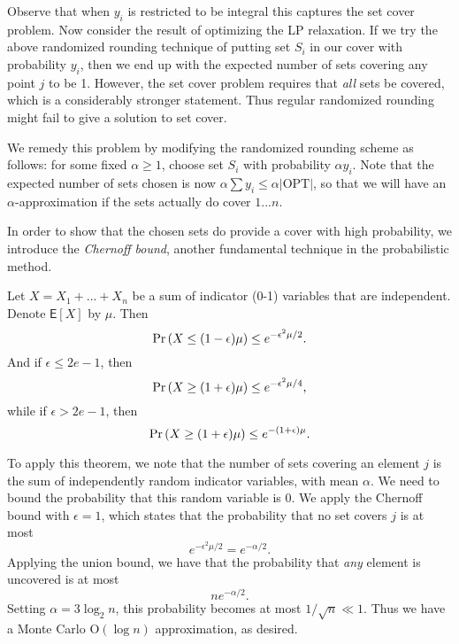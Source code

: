 \documentclass{article}
\renewcommand{\Pr}[1]{\textrm{\textup{Pr}}\left( #1 \right)}
\newcommand{\E}{\mbox{$\mathsf E$}}
\begin{document}
Observe that when $y_i$ is restricted to be integral this captures the set cover problem.  Now consider the result of optimizing the LP relaxation.  If we try the above randomized rounding technique of putting set $S_i$ in our cover with probability $y_i$, then we end up with the expected number of sets covering any point $j$ to be 1.  However, the set cover problem requires that \emph{all} sets be covered, which is a considerably stronger statement.  Thus regular randomized rounding might fail to give a solution to set cover.

We remedy this problem by modifying the randomized rounding scheme as follows: for some fixed $\alpha\geq 1$, choose set $S_i$ with probability $\alpha y_i$.  Note that the expected number of sets chosen is now $\alpha\sum y_i\leq \alpha |\textrm{OPT}|$, so that we will have an $\alpha$-approximation if the sets actually do cover $1...n$.

In order to show that the chosen sets do provide a cover with high probability, we introduce the \emph{Chernoff bound}, another fundamental technique in the probabilistic method.

\begin{theorem}
Let $X=X_1+...+X_n$ be a sum of indicator (0-1) variables that are independent.  Denote $\E[X]$ by $\mu$.  Then $$\Pr{X\leq(1-\epsilon)\mu}\leq e^{-\epsilon^2\mu/2}.$$
And if $\epsilon\leq 2e-1$, then $$\Pr{X\geq(1+\epsilon)\mu}\leq e^{-\epsilon^2\mu/4},$$
while if $\epsilon>2e-1$, then $$\Pr{X\geq(1+\epsilon)\mu}\leq e^{-(1+\epsilon)\mu}.$$
\end{theorem}
To apply this theorem, we note that the number of sets covering an element $j$ is the sum of independently random indicator variables, with mean $\alpha$.  We need to bound the probability that this random variable is 0.  We apply the Chernoff bound with $\epsilon=1$, which states that the probability that no set covers $j$ is at most $$e^{-\epsilon^2\mu/2}=e^{-\alpha/2}.$$
Applying the union bound, we have that the probability that \emph{any} element is uncovered is at most $$ne^{-\alpha/2}.$$  Setting $\alpha=3\log_2 n$, this probability becomes at most $1/\sqrt{n}\ll 1$.  Thus we have a Monte Carlo $\textrm{O}(\log n)$ approximation, as desired.
\end{document}
